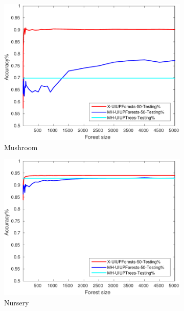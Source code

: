 \begin{figure}[ht]
\begin{subfigure}[b]{0.3\textwidth}
  	\includegraphics[width=\textwidth]{figs/PLPTF/Forests/MushroomDownsampled_Forests_X_MH.pdf}
  	\caption{Mushroom}
		\label{fig:Mush3}
	\end{subfigure}
  \begin{subfigure}[b]{0.3\textwidth}
		\centering
  	\includegraphics[width=\textwidth]{figs/PLPTF/Forests/NurseryDownsampledFurther_Forests_X_MH.pdf}
  	\caption{Nursery}
		\label{fig:N3}
	\end{subfigure}
  \begin{subfigure}[b]{0.3\textwidth}
		\centering

\end{subfigure}
\end{figure}
